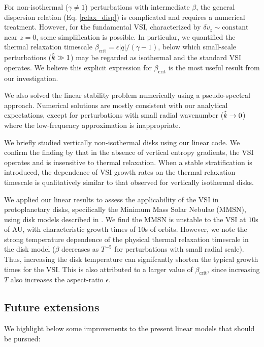 For non-isothermal ($\gamma\neq1$) perturbations with intermediate
$\beta$, the general dispersion relation
(Eq. \ref{relax_disp}) is complicated and requires a numerical
treatment. However, for the fundamental VSI, characterized by  $\delta
v_z\sim\mathrm{constant}$ near $z=0$, some simplification is
possible. In particular, we quantified the thermal relaxation
timescale $\beta_\mathrm{crit}=\epsilon|q|/(\gamma-1)$, below
which small-scale perturbations ($\hat{k}\gg 1$) may be regarded as isothermal
and the standard VSI operates. We believe this explicit expression for
$\beta_\mathrm{crit}$ is the most useful result from our
investigation. 

We also solved the linear stability problem numerically using a
pseudo-spectral approach. Numerical solutions are mostly consistent
with our analytical expectations, except for perturbations with small
radial wavenumber ($\hat{k}\to0$) where the low-frequency approximation
is inappropriate.  

We briefly studied vertically non-isothermal disks using our linear
code. We confirm the finding by \cite{nelson13} that in the absence
of vertical entropy gradients, the VSI operates and is insensitive to thermal relaxation. When a
stable stratification is introduced, the dependence of VSI growth
rates on the thermal relaxation timescale is qualitatively similar to
that observed for vertically isothermal disks. 


We applied our linear results to assess the applicability of the VSI in
protoplanetary disks, specifically the Minimum Mass Solar Nebulae (MMSN),
using disk models described in \cite{chiang10}. We find the MMSN is
unstable to the VSI at $10$s of AU, with characteristic
growth times of $10$s of orbits. However, we note the strong
temperature dependence of the physical thermal relaxation timescale
in the disk model ($\beta$ decreases as $T^{-5}$ for perturbations with small
radial scale). Thus, increasing the disk temperature can signifcantly 
shorten the typical growth times for the VSI. This is also attributed
to a larger value of $\beta_\mathrm{crit}$, since increasing $T$ also
increases the aspect-ratio $\epsilon$. 

\subsection{Future extensions} 
We highlight below some improvements to the present  
linear models that should be pursued:

